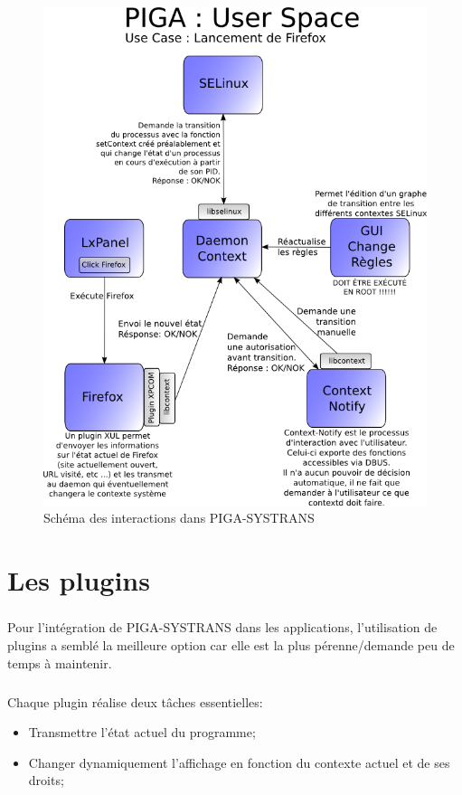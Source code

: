 	\begin{figure}[!h]
		\includegraphics[width=17cm]{images/userspace.png}
		\caption{Schéma des interactions dans PIGA-SYSTRANS}
		\label{schema_piga_systrans}
	\end{figure}
		
\chapter{Les plugins}
	\label{PIGA_SYSTRANS plugins}
	
	\paragraph*{}
		Pour l'intégration de PIGA-SYSTRANS dans les applications, l'utilisation de plugins a semblé la meilleure option car elle est la plus pérenne/demande peu de temps à maintenir.
		
	\paragraph*{}
		Chaque plugin réalise deux tâches essentielles:
		\begin{itemize}
   			\item Transmettre l'état actuel du programme;
   			\item Changer dynamiquement l'affichage en fonction du contexte actuel et de ses droits;
   		\end{itemize}
	
